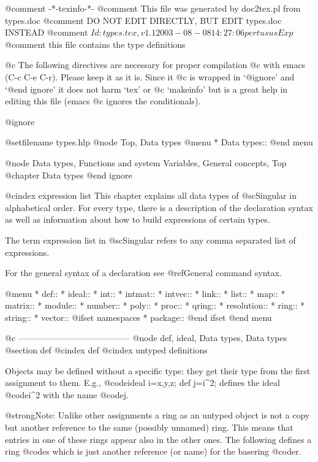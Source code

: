 @comment -*-texinfo-*-
@comment This file was generated by doc2tex.pl from types.doc
@comment DO NOT EDIT DIRECTLY, BUT EDIT types.doc INSTEAD
@comment $Id: types.tex,v 1.1 2003-08-08 14:27:06 pertusus Exp $
@comment this file contains the type definitions

@c The following directives are necessary for proper compilation
@c with emacs (C-c C-e C-r).  Please keep it as it is.  Since it
@c is wrapped in `@ignore' and `@end ignore' it does not harm `tex' or
@c `makeinfo' but is a great help in editing this file (emacs
@c ignores the conditionals).

@ignore

@setfilename types.hlp
@node Top, Data types
@menu
* Data types::
@end menu

@node Data types, Functions and system Variables, General concepts, Top
@chapter Data types
@end ignore

@cindex expression list
This chapter explains all data types of @sc{Singular} in
alphabetical order. For every type, there is a description of the
declaration syntax as well as information about how to build expressions
of certain types.

The term expression list in @sc{Singular} refers to any comma separated
list of expressions.

For the general syntax of a declaration see @ref{General command syntax}.

@menu
* def::
* ideal::
* int::
* intmat::
* intvec::
* link::
* list::
* map::
* matrix::
* module::
* number::
* poly::
* proc::
* qring::
* resolution::
* ring::
* string::
* vector::
@ifset namespaces
* package::
@end ifset
@end menu

@c ---------------------------------------
@node def, ideal, Data types, Data types
@section def
@cindex def
@cindex untyped definitions

Objects may be defined without a specific type: they get their
type from the first assignment to them.
E.g., @code{ideal i=x,y,z; def j=i^2;} defines the ideal @code{i^2}
with the name @code{j}.

@strong{Note:} Unlike other assignments a ring as an untyped object
is not a copy but another reference to the same (possibly unnamed) ring.
This means that entries in one of these rings appear also in the other ones.
The following defines a ring @code{s} which is just another reference (or name)
for the basering @code{r}.

